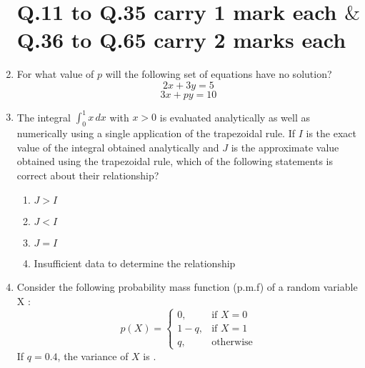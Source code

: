 \documentclass[journal]{IEEEtran}
\begin{document}
\begin{enumerate}
    \section*{Q.11 to Q.35 carry 1 mark each $\&$ Q.36 to Q.65 carry 2 marks each}
    \item For what value of $p$ will the following set of equations have no solution?
\[
    2x + 3y = 5
\]
\[
    3x + py = 10
\]
    \item The integral $\int_0^1 x \, dx$ with $x > 0$ is evaluated analytically as well as numerically using a single application of the trapezoidal rule. If $I$ is the exact value of the integral obtained analytically and $J$ is the approximate value obtained using the trapezoidal rule, which of the following statements is correct about their relationship?
    \begin{enumerate}
        \item $J > I$
        \item $J < I$
        \item $J = I$
        \item Insufficient data to determine the relationship
    \end{enumerate}
    \item Consider the following probability mass function (p.m.f) of a random variable X :
\[
    p(X) =
    \begin{cases}
        0, & \text{if } X = 0 \\
        1 - q, & \text{if } X = 1 \\
        q, & \text{otherwise}
    \end{cases}
    \]
    If $q = 0.4$, the variance of $X$ is \underline{\hspace{1cm}}.
\end{enumerate}
\end{document}
